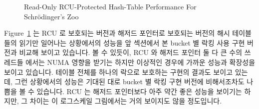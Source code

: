 \begin{figure}[tb]
\centering
{}
\caption{Read-Only RCU-Protected Hash-Table Performance For Schr\"odinger's Zoo}
\label{fig:datastruct:Read-Only RCU-Protected Hash-Table Performance For Schroedinger's Zoo}
\end{figure}

Figure~\ref{fig:datastruct:Read-Only RCU-Protected Hash-Table Performance For Schroedinger's Zoo}
는 RCU 로 보호되는 버전과 해저드 포인터로 보호되는 버전의 해시 테이블들의
읽기만 일어나는 상황에서의 성능을 앞 섹션에서 본 bucket 별 락킹 사용 구현
버전과 비교해 보이고 있습니다.
볼 수 있듯이, RCU 와 해저드 포인터 둘 다 큰 수의 쓰레드들 에서는 NUMA 영향을
받기는 하지만 이상적인 경우에 가까운 성능과 확장성을 보이고 있습니다.
테이블 전체를 하나의 락으로 보호하는 구현의 결과도 보이고 있는데, 그런
상황에서의 성능은 기대된 대로 bucket 별 락킹 구현 버전에 비해서조차도 나쁨을 볼
수 있습니다.
RCU 는 해저드 포인터보다 아주 약간 좋은 성능을 보이기는 하지만, 그 차이는 이
로그스케일 그림에서는 거의 보이지도 않을 정도입니다.

